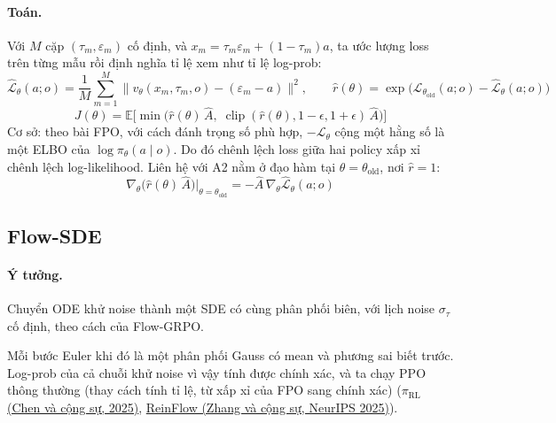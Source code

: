 \documentclass[11pt,a4paper]{article}
\newcommand{\Lfm}{\mathcal{L}}
\newcommand{\Lhat}{\hat{\mathcal{L}}}
\newcommand{\thold}{\theta_{\text{old}}}
\begin{document}
\paragraph{Toán.}
Với $M$ cặp $(\tau_m, \varepsilon_m)$ cố định, và $x_m = \tau_m\varepsilon_m + (1 - \tau_m)a$, ta ước lượng loss trên từng mẫu rồi định nghĩa tỉ lệ xem như tỉ lệ log-prob:
\begin{equation}
  \Lhat_\theta(a;o) = \frac{1}{M}\sum_{m=1}^{M}\big\| v_\theta(x_m, \tau_m, o) - (\varepsilon_m - a) \big\|^2, \qquad
  \hat r(\theta) = \exp\!\big(\Lhat_{\thold}(a;o) - \Lhat_\theta(a;o)\big)
\end{equation}
\begin{equation}
  J(\theta) = \mathbb{E}\Big[\min\big(\hat r(\theta)\,\hat A,\; \operatorname{clip}(\hat r(\theta), 1-\epsilon, 1+\epsilon)\,\hat A\big)\Big]
\end{equation}
Cơ sở: theo bài FPO, với cách đánh trọng số phù hợp, $-\Lfm_\theta$ cộng một hằng số là một ELBO của $\log \pi_\theta(a\mid o)$. Do đó chênh lệch loss giữa hai policy xấp xỉ chênh lệch log-likelihood. Liên hệ với A2 nằm ở đạo hàm tại $\theta = \thold$, nơi $\hat r = 1$:
\begin{equation}
  \nabla_\theta\big(\hat r(\theta)\,\hat A\big)\Big|_{\theta=\thold} = -\hat A\,\nabla_\theta \Lhat_\theta(a;o)
\end{equation}

\subsection{Flow-SDE}

\paragraph{Ý tưởng.}
Chuyển ODE khử noise thành một SDE có cùng phân phối biên, với lịch noise $\sigma_\tau$ cố định, theo cách của Flow-GRPO.

Mỗi bước Euler khi đó là một phân phối Gauss có mean và phương sai biết trước. Log-prob của cả chuỗi khử noise vì vậy tính được chính xác, và ta chạy PPO thông thường (thay cách tính tỉ lệ, từ xấp xỉ của FPO sang chính xác)
(\href{https://arxiv.org/abs/2510.25889}{$\pi_{\text{RL}}$ (Chen và cộng sự, 2025)}, \href{https://arxiv.org/abs/2505.22094}{ReinFlow (Zhang và cộng sự, NeurIPS 2025)}).
\end{document}
